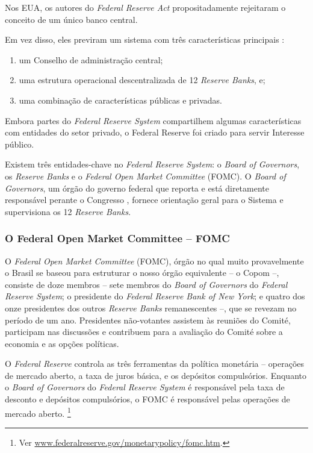 \documentclass[
	10pt,				%
	openright,			%
	twoside,			%
	a5paper,			%
	english,			%
	french,				%
	spanish,			%
	brazil				%
	]{abntex2}
\begin{document}
Nos EUA, os autores do \emph{Federal Reserve Act} propositadamente
rejeitaram o conceito de um único banco central.

Em vez disso, eles previram um sistema com três características
principais \cite{fed1}:

\begin{enumerate}
\def\labelenumi{\arabic{enumi})}
\tightlist
\item
  um Conselho de administração central;
\item
  uma estrutura operacional descentralizada de 12 \emph{Reserve Banks},
  e;
\item
  uma combinação de características públicas e privadas.
\end{enumerate}

Embora partes do \emph{Federal Reserve System} compartilhem algumas
características com entidades do setor privado, o Federal Reserve foi
criado para servir Interesse público.

Existem três entidades-chave no \emph{Federal Reserve System}: o
\emph{Board of Governors}, os \emph{Reserve Banks} e o \emph{Federal
Open Market Committee} (FOMC). O \emph{Board of Governors}, um órgão do
governo federal que reporta e está diretamente responsável perante o
Congresso , fornece orientação geral para o Sistema e supervisiona os 12
\emph{Reserve Banks}.

\subsubsection{O Federal Open Market Committee --
FOMC}\label{o-federal-open-market-committee-fomc}

O \emph{Federal Open Market Committee} (FOMC), órgão no qual muito
provavelmente o Brasil se baseou para estruturar o nosso órgão
equivalente -- o Copom --, consiste de doze membros -- sete membros do
\emph{Board of Governors} do \emph{Federal Reserve System}; o presidente
do \emph{Federal Reserve Bank of New York}; e quatro dos onze
presidentes dos outros \emph{Reserve Banks} remanescentes --, que se
revezam no período de um ano. Presidentes não-votantes assistem às
reuniões do Comité, participam nas discussões e contribuem para a
avaliação do Comité sobre a economia e as opções políticas.

O \emph{Federal Reserve} controla as três ferramentas da política
monetária -- operações de mercado aberto, a taxa de juros básica, e os
depósitos compulsórios. Enquanto o \emph{Board of Governors} do
\emph{Federal Reserve System} é responsável pela taxa de desconto e
depósitos compulsórios, o FOMC é responsável pelas operações de mercado
aberto. \footnote{Ver
  \href{https://www.federalreserve.gov/monetarypolicy/fomc.htm}{www.federalreserve.gov/monetarypolicy/fomc.htm}.}
\end{document}
